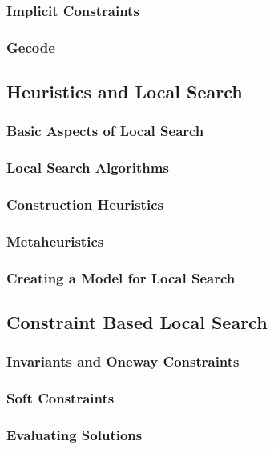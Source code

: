 \documentclass[a4paper,11pt]{article}
\begin{document}
    \subsubsection{Implicit Constraints}
    
    \subsubsection{Gecode}
    
  \subsection{Heuristics and Local Search}
  
     \subsubsection{Basic Aspects of Local Search}
    
    \subsubsection{Local Search Algorithms}
    
    \subsubsection{Construction Heuristics}
    
    \subsubsection{Metaheuristics}
    
    \subsubsection{Creating a Model for Local Search}
    
  \subsection{Constraint Based Local Search}
  
    \subsubsection{Invariants and Oneway Constraints}
    
    \subsubsection{Soft Constraints}
    
    \subsubsection{Evaluating Solutions}
    
\end{document}
